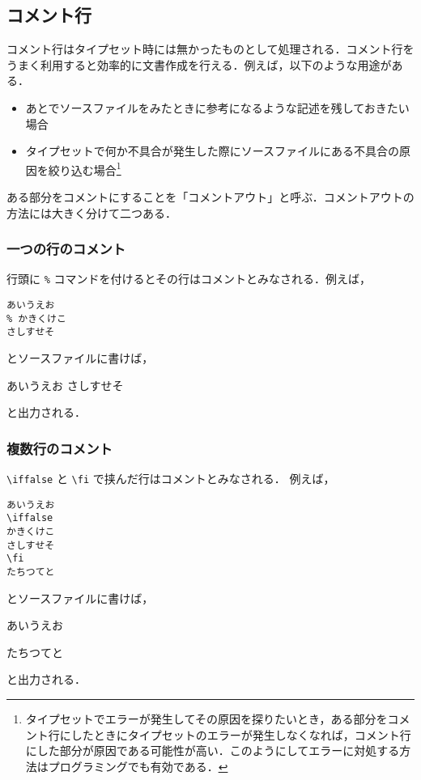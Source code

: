\subsection{コメント行}

コメント行はタイプセット時には無かったものとして処理される．コメント行をうまく利用すると効率的に文書作成を行える．例えば，以下のような用途がある．

\begin{itemize}
    \item あとでソースファイルをみたときに参考になるような記述を残しておきたい場合
    \item タイプセットで何か不具合が発生した際にソースファイルにある不具合の原因を絞り込む場合\footnote{タイプセットでエラーが発生してその原因を探りたいとき，ある部分をコメント行にしたときにタイプセットのエラーが発生しなくなれば，コメント行にした部分が原因である可能性が高い．このようにしてエラーに対処する方法はプログラミングでも有効である．}
\end{itemize}

ある部分をコメントにすることを「コメントアウト」と呼ぶ．コメントアウトの方法には大きく分けて二つある．

\subsubsection{一つの行のコメント}

行頭に \verb|%| コマンドを付けるとその行はコメントとみなされる．例えば，
\begin{screen}
\begin{verbatim}
あいうえお
% かきくけこ
さしすせそ
\end{verbatim}
\end{screen}
とソースファイルに書けば，
\begin{screen}
あいうえお
さしすせそ
\end{screen}
と出力される．

\subsubsection{複数行のコメント}

\verb|\iffalse| と \verb|\fi| で挟んだ行はコメントとみなされる．
例えば，
\begin{screen}
\begin{verbatim}
あいうえお
\iffalse
かきくけこ
さしすせそ
\fi
たちつてと
\end{verbatim}
\end{screen}
とソースファイルに書けば，
\begin{screen}
あいうえお
\iffalse
かきくけこ
さしすせそ
\fi
たちつてと
\end{screen}
と出力される．
